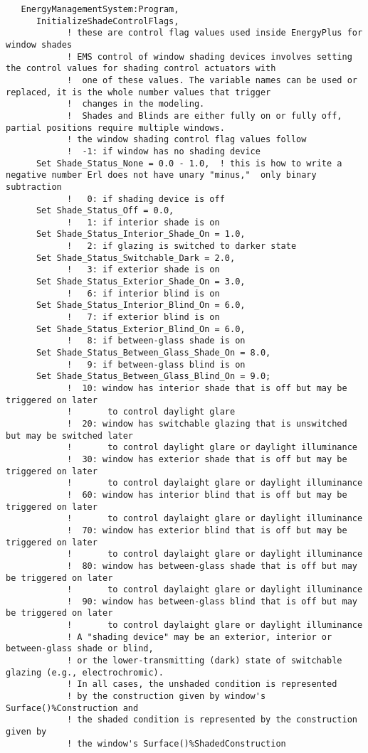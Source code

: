 \begin{lstlisting}
   EnergyManagementSystem:Program,
      InitializeShadeControlFlags,
            ! these are control flag values used inside EnergyPlus for window shades
            ! EMS control of window shading devices involves setting the control values for shading control actuators with
            !  one of these values. The variable names can be used or replaced, it is the whole number values that trigger
            !  changes in the modeling.
            !  Shades and Blinds are either fully on or fully off, partial positions require multiple windows.
            ! the window shading control flag values follow
            !  -1: if window has no shading device
      Set Shade_Status_None = 0.0 - 1.0,  ! this is how to write a negative number Erl does not have unary "minus,"  only binary subtraction
            !   0: if shading device is off
      Set Shade_Status_Off = 0.0,
            !   1: if interior shade is on
      Set Shade_Status_Interior_Shade_On = 1.0,
            !   2: if glazing is switched to darker state
      Set Shade_Status_Switchable_Dark = 2.0,
            !   3: if exterior shade is on
      Set Shade_Status_Exterior_Shade_On = 3.0,
            !   6: if interior blind is on
      Set Shade_Status_Interior_Blind_On = 6.0,
            !   7: if exterior blind is on
      Set Shade_Status_Exterior_Blind_On = 6.0,
            !   8: if between-glass shade is on
      Set Shade_Status_Between_Glass_Shade_On = 8.0,
            !   9: if between-glass blind is on
      Set Shade_Status_Between_Glass_Blind_On = 9.0;
            !  10: window has interior shade that is off but may be triggered on later
            !       to control daylight glare
            !  20: window has switchable glazing that is unswitched but may be switched later
            !       to control daylight glare or daylight illuminance
            !  30: window has exterior shade that is off but may be triggered on later
            !       to control daylaight glare or daylight illuminance
            !  60: window has interior blind that is off but may be triggered on later
            !       to control daylaight glare or daylight illuminance
            !  70: window has exterior blind that is off but may be triggered on later
            !       to control daylaight glare or daylight illuminance
            !  80: window has between-glass shade that is off but may be triggered on later
            !       to control daylaight glare or daylight illuminance
            !  90: window has between-glass blind that is off but may be triggered on later
            !       to control daylaight glare or daylight illuminance
            ! A "shading device" may be an exterior, interior or between-glass shade or blind,
            ! or the lower-transmitting (dark) state of switchable glazing (e.g., electrochromic).
            ! In all cases, the unshaded condition is represented
            ! by the construction given by window's Surface()%Construction and
            ! the shaded condition is represented by the construction given by
            ! the window's Surface()%ShadedConstruction
\end{lstlisting}
